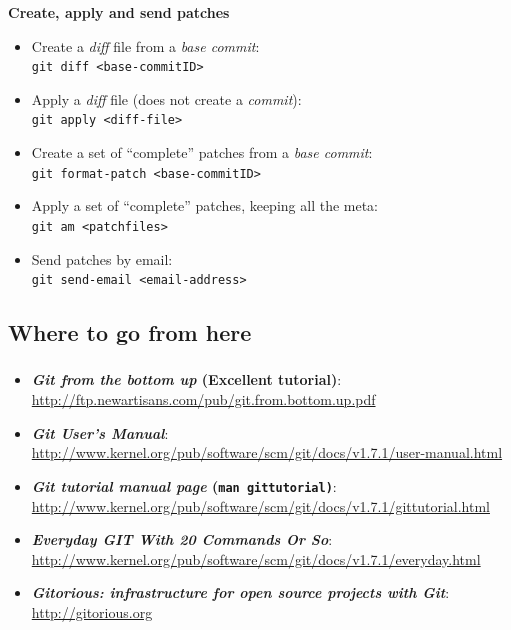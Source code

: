 \begin{frame}
  \frametitle{\insertsubsection}

  \textbf{Create, apply and send patches} \\
  \begin{itemize}
  \item Create a \textit{diff} file from a \textit{base commit}:\\
    \texttt{git diff <base-commitID>}
    \vspacing
  \item Apply a \textit{diff} file (does not create a \textit{commit}):\\
    \texttt{git apply <diff-file>}
    \vspacing
  \item Create a set of ``complete'' patches from a \textit{base commit}:\\
    \texttt{git format-patch <base-commitID>}
    \vspacing
  \item Apply a set of ``complete'' patches, keeping all the meta:\\
    \texttt{git am <patchfiles>}
    \vspacing
  \item Send patches by email:\\
    \texttt{git send-email <email-address>}
    \vspacing
  \end{itemize}
\end{frame}

\subsection{Where to go from here}
\begin{frame}
  \frametitle{\insertsubsection}

  \begin{itemize}
  \item \textbf{\textit{Git from the bottom up} (Excellent tutorial)}:\\
    \url{http://ftp.newartisans.com/pub/git.from.bottom.up.pdf}
    \vspacing
  \item \textbf{\textit{Git User's Manual}}:\\
    \url{http://www.kernel.org/pub/software/scm/git/docs/v1.7.1/user-manual.html}
    \vspacing
  \item \textbf{\textit{Git tutorial manual page} (\texttt{man gittutorial)}}:\\
    \url{http://www.kernel.org/pub/software/scm/git/docs/v1.7.1/gittutorial.html}
    \vspacing
  \item \textbf{\textit{Everyday GIT With 20 Commands Or So}}:\\
    \url{http://www.kernel.org/pub/software/scm/git/docs/v1.7.1/everyday.html}
    \vspacing
  \item \textbf{\textit{Gitorious: infrastructure for open source projects with Git}}:\\
    \url{http://gitorious.org}
    \vspacing
  \end{itemize}
\end{frame}

